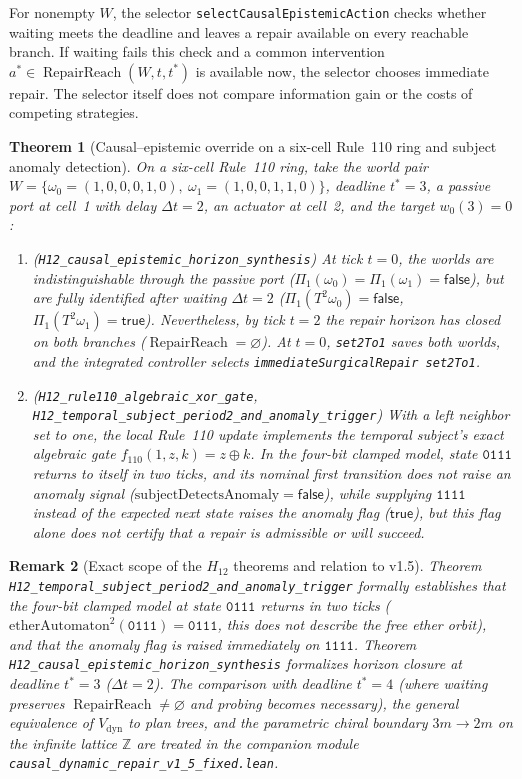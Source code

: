 \documentclass[11pt,a4paper]{article}
\theoremstyle{cleanthm}
\newtheorem{theorem}{Theorem}[section]
\newtheorem{remark}[theorem]{Remark}
\DeclareMathOperator{\RepairReach}{RepairReach}
\DeclareRobustCommand{\id}[1]{\allowbreak\nolinkurl{#1}\allowbreak}
\begin{document}
For nonempty $W$, the selector \id{selectCausalEpistemicAction} checks whether waiting meets the deadline and leaves a repair available on every reachable branch. If waiting fails this check and a common intervention $a^*\in\RepairReach(W,t,t^*)$ is available now, the selector chooses immediate repair. The selector itself does not compare information gain or the costs of competing strategies.

\begin{theorem}[Causal--epistemic override on a six-cell Rule~110 ring and subject anomaly detection]
\label{thm:h12_synthesis}
On a six-cell Rule~110 ring, take the world pair $W=\{\omega_0=(1,0,0,0,1,0),\ \omega_1=(1,0,0,1,1,0)\}$, deadline $t^*=3$, a passive port at cell~1 with delay $\Delta t=2$, an actuator at cell~2, and the target $w_0(3)=0$:
\begin{enumerate}
\item (\id{H12_causal_epistemic_horizon_synthesis}) At tick $t=0$, the worlds are indistinguishable through the passive port ($\Pi_1(\omega_0)=\Pi_1(\omega_1)=\mathsf{false}$), but are fully identified after waiting $\Delta t=2$ ($\Pi_1(T^2\omega_0)=\mathsf{false}$, $\Pi_1(T^2\omega_1)=\mathsf{true}$). Nevertheless, by tick $t=2$ the repair horizon has closed on both branches ($\RepairReach=\varnothing$). At $t=0$, \id{set2To1} saves both worlds, and the integrated controller selects \id{immediateSurgicalRepair set2To1}.
\item (\id{H12_rule110_algebraic_xor_gate}, \id{H12_temporal_subject_period2_and_anomaly_trigger}) With a left neighbor set to one, the local Rule~110 update implements the temporal subject's exact algebraic gate $f_{110}(1,z,k)=z\oplus k$. In the four-bit clamped model, state $\mathtt{0111}$ returns to itself in two ticks, and its nominal first transition does not raise an anomaly signal ($\mathrm{subjectDetectsAnomaly}=\mathsf{false}$), while supplying $\mathtt{1111}$ instead of the expected next state raises the anomaly flag ($\mathsf{true}$), but this flag alone does not certify that a repair is admissible or will succeed.
\end{enumerate}
\end{theorem}

\begin{remark}[Exact scope of the $H_{12}$ theorems and relation to v1.5]
\label{rem:h12_scope}
Theorem \id{H12_temporal_subject_period2_and_anomaly_trigger} formally establishes that the four-bit clamped model at state $\mathtt{0111}$ returns in two ticks ($\mathrm{etherAutomaton}^2(\mathtt{0111})=\mathtt{0111}$, this does not describe the free ether orbit), and that the anomaly flag is raised immediately on $\mathtt{1111}$. Theorem \id{H12_causal_epistemic_horizon_synthesis} formalizes horizon closure at deadline $t^*=3$ ($\Delta t=2$). The comparison with deadline $t^*=4$ (where waiting preserves $\RepairReach\ne\varnothing$ and probing becomes necessary), the general equivalence of $V_{\mathrm{dyn}}$ to plan trees, and the parametric chiral boundary $3m\to2m$ on the infinite lattice $\mathbb Z$ are treated in the companion module \id{causal_dynamic_repair_v1_5_fixed.lean}.
\end{remark}
\end{document}
